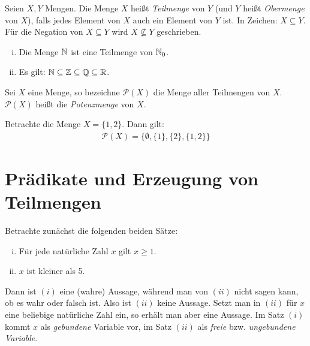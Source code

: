\begin{mydef}
Seien $X,Y$ Mengen. Die Menge $X$ heißt \textit{Teilmenge} von $Y$ (und $Y$
heißt \textit{Obermenge} von $X$), falls jedes Element von $X$ auch ein Element
von $Y$ ist.
In Zeichen: $X \subseteq Y$.
Für die Negation von $X \subseteq Y$ wird $X \nsubseteq Y$ geschrieben.
\end{mydef}

\begin{example}
    \begin{enumerate}[(i)]
        \item
        Die Menge $\mathbb{N}$ ist eine Teilmenge von $\mathbb{N}_0$.
        \item
        Es gilt: $\mathbb{N} \subseteq \mathbb{Z} \subseteq \mathbb{Q} \subseteq \mathbb{R}$.
    \end{enumerate}
\end{example}

\begin{mydef}
Sei $X$ eine Menge, so bezeichne $\mathcal{P}(X)$ die Menge aller Teilmengen
von $X$.
$\mathcal{P}(X)$ heißt die \textit{Potenzmenge} von $X$.
\end{mydef}

\begin{example}
Betrachte die Menge $X = \{1,2\}$.
Dann gilt:
\begin{align*}
  \mathcal{P}(X) = \{\emptyset, \{1\}, \{2\}, \{1,2\}\}
\end{align*}
\end{example}


\section{Prädikate und Erzeugung von Teilmengen}

Betrachte zunächst die folgenden beiden Sätze:
\begin{enumerate}[(i)]
    \item
    Für jede natürliche Zahl $x$ gilt $x \geq 1$.
    \item
    $x$ ist kleiner als 5.
\end{enumerate}

Dann ist $(i)$ eine (wahre) Aussage, während man von $(ii)$ nicht sagen kann,
ob es wahr oder falsch ist.
Also ist $(ii)$ keine Aussage.
Setzt man in $(ii)$ für $x$ eine beliebige natürliche Zahl ein, so erhält man
aber eine Aussage.
Im Satz $(i)$ kommt $x$ als \textit{gebundene} Variable vor, im Satz $(ii)$ als
\textit{freie} bzw. \textit{ungebundene Variable}.


